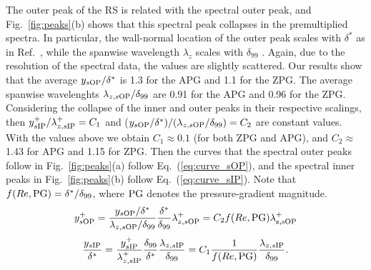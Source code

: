 The outer peak of the RS is related with the spectral outer peak, and Fig.~\ref{fig:peaks}(b) shows that this spectral peak collapses in the premultiplied spectra. In particular, the wall-normal location of the outer peak scales with $\delta^*$ as in Ref.~\cite{Kitsios2017}, while the spanwise wavelength $\lambda_z$ scales with $\delta_{99}$ \cite{Lee2017, bobke2017}. Again, due to the resolution of the spectral data, the values are slightly scattered. 
Our results show that the average $y_{s \rm OP}/\delta^*$ is 1.3 for the APG and 1.1 for the ZPG. The average spanwise wavelenghts $\lambda_{z, s \rm OP}/\delta_{99}$ are 0.91 for the APG and 0.96 for the ZPG.
Considering the collapse of the inner and outer peaks in their respective scalings, then $y^+_{s \rm IP}/\lambda^+_{z, s \rm IP}=C_1$ and ($y_{s \rm OP}/\delta^*)/(\lambda_{z, s \rm OP}/\delta_{99}) = C_2$ are constant values. With the values above we obtain $C_1 \approx 0.1$ (for both ZPG and APG), and $C_2 \approx$ 1.43 for APG and 1.15 for ZPG.
Then the curves that the spectral outer peaks follow in Fig.~\ref{fig:peaks}(a) follow Eq.~(\ref{eq:curve_sOP}), and the spectral inner peaks in Fig.~\ref{fig:peaks}(b) follow Eq.~(\ref{eq:curve_sIP}). Note that $f(Re, \rm PG) = \delta^*/\delta_{99}$, where ${\rm PG}$ denotes the pressure-gradient magnitude. 
\begin{equation}
    y_{s \rm OP}^+ = \frac{y_{s \rm OP}/\delta^*}{\lambda_{z, s \rm OP}/\delta_{99}} \frac{\delta^*}{\delta_{99}} \lambda_{z, s \rm OP}^+  = C_2 f(Re, \rm PG) \lambda_{z, s \rm OP}^+
    \label{eq:curve_sOP}
\end{equation}
\begin{equation}
        \frac{y_{s \rm IP}}{\delta^*} = \frac{y_{s \rm IP}^+}{\lambda^+_{z, s \rm IP}} \frac{\delta_{99}}{\delta^*} \frac{\lambda_{z, s \rm IP}}{\delta_{99}}  = C_1 \frac{1}{f(Re, \rm PG)} \frac{\lambda_{z, s \rm IP}}{\delta_{99}}.
        \label{eq:curve_sIP}
\end{equation}

